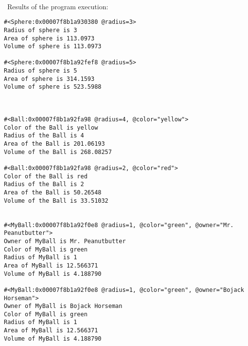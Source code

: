 \documentclass{article}
\begin{document}
\paragraph{}\
	Results of the program execution:
	
\begin{verbatim}
#<Sphere:0x00007f8b1a930380 @radius=3>
Radius of sphere is 3
Area of sphere is 113.0973
Volume of sphere is 113.0973

#<Sphere:0x00007f8b1a92fef8 @radius=5>
Radius of sphere is 5
Area of sphere is 314.1593
Volume of sphere is 523.5988



#<Ball:0x00007f8b1a92fa98 @radius=4, @color="yellow">
Color of the Ball is yellow
Radius of the Ball is 4
Area of the Ball is 201.06193
Volume of the Ball is 268.08257

#<Ball:0x00007f8b1a92fa98 @radius=2, @color="red">
Color of the Ball is red
Radius of the Ball is 2
Area of the Ball is 50.26548
Volume of the Ball is 33.51032


#<MyBall:0x00007f8b1a92f0e8 @radius=1, @color="green", @owner="Mr. Peanutbutter">
Owner of MyBall is Mr. Peanutbutter
Color of MyBall is green
Radius of MyBall is 1
Area of MyBall is 12.566371
Volume of MyBall is 4.188790

#<MyBall:0x00007f8b1a92f0e8 @radius=1, @color="green", @owner="Bojack Horseman">
Owner of MyBall is Bojack Horseman
Color of MyBall is green
Radius of MyBall is 1
Area of MyBall is 12.566371
Volume of MyBall is 4.188790
\end{verbatim}

\paragraph{}\
\paragraph{}\
\end{document}
